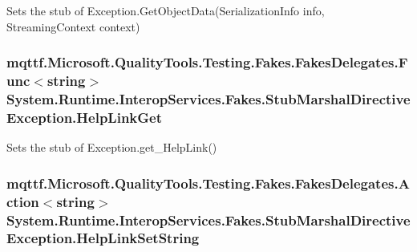 Sets the stub of Exception.\-Get\-Object\-Data(\-Serialization\-Info info, Streaming\-Context context)

\hypertarget{class_system_1_1_runtime_1_1_interop_services_1_1_fakes_1_1_stub_marshal_directive_exception_aa5aa8153ff5d669bd0c14adfca822ff4}{
\subsubsection[{Help\-Link\-Get}]{\setlength{\rightskip}{0pt plus 5cm}mqttf.\-Microsoft.\-Quality\-Tools.\-Testing.\-Fakes.\-Fakes\-Delegates.\-Func$<$string$>$ System.\-Runtime.\-Interop\-Services.\-Fakes.\-Stub\-Marshal\-Directive\-Exception.\-Help\-Link\-Get}}\label{class_system_1_1_runtime_1_1_interop_services_1_1_fakes_1_1_stub_marshal_directive_exception_aa5aa8153ff5d669bd0c14adfca822ff4}


Sets the stub of Exception.\-get\-\_\-\-Help\-Link()

\hypertarget{class_system_1_1_runtime_1_1_interop_services_1_1_fakes_1_1_stub_marshal_directive_exception_a2fe15759221d54d17f3143befdba7b6f}{
\subsubsection[{Help\-Link\-Set\-String}]{\setlength{\rightskip}{0pt plus 5cm}mqttf.\-Microsoft.\-Quality\-Tools.\-Testing.\-Fakes.\-Fakes\-Delegates.\-Action$<$string$>$ System.\-Runtime.\-Interop\-Services.\-Fakes.\-Stub\-Marshal\-Directive\-Exception.\-Help\-Link\-Set\-String}}\label{class_system_1_1_runtime_1_1_interop_services_1_1_fakes_1_1_stub_marshal_directive_exception_a2fe15759221d54d17f3143befdba7b6f}


